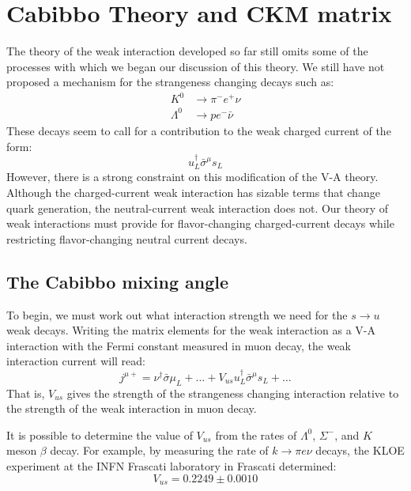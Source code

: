 \documentclass[../../main/main.tex]{subfiles}
\begin{document}

\section{Cabibbo Theory and CKM matrix}
The theory of the weak interaction developed so far still omits some of the processes with which we began our discussion of this
theory. We still have not proposed a mechanism for the strangeness changing decays such as:
\begin{align}
	K^0 &\longrightarrow \pi^- e^+ \nu \\
	\Lambda^0 &\longrightarrow pe^-\bar{\nu}
\end{align}
These decays seem to call for a contribution to the weak charged current of the form:
\begin{equation}
	u^{\dag}_L \bar{\sigma}^{\mu} s_L
	\label{eq:}
\end{equation}
However, there is a strong constraint on this modification of the V-A theory. Although the charged-current weak interaction has sizable terms that change quark generation, the neutral-current weak interaction does not. Our theory of weak interactions must provide for flavor-changing charged-current decays while restricting flavor-changing neutral current decays.



\subsection{The Cabibbo mixing angle}
To begin, we must work out what interaction strength we need for
the \( s \rightarrow u \) weak decays. Writing the matrix elements for the weak interaction as a V-A interaction with the Fermi constant measured in muon decay, the weak interaction current will read:
\begin{equation}
	j^{\mu +}
	=
	\nu^{\dag} \bar{\sigma} \mu_L +
	\dots +
	V_{us} u^{\dag}_L \bar{\sigma}^{\mu} s_L +
	\dots
	\label{eq:L18_CMAVUS}
\end{equation}
That is, \( V_{us} \) gives the strength of the strangeness changing interaction relative to the strength of the weak interaction in muon decay.

It is possible to determine the value of \( V_{us} \) from the rates of \( \Lambda^0 \), \( \Sigma^- \), and \( K \) meson \( \beta \) decay. For example, by measuring the rate of \( k \rightarrow \pi e \nu \) decays, the KLOE experiment at the INFN Frascati laboratory in Frascati determined:
\begin{equation}
	V_{us}
	=
	0.2249 \pm 0.0010
	\label{eq:}
\end{equation}
\end{document}
